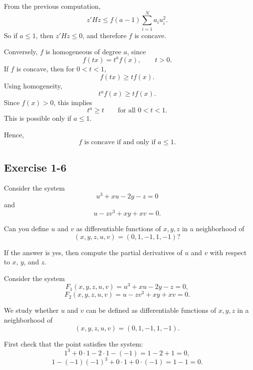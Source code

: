 From the previous computation,
\[
z'H z
\le
f(a-1)\sum_{i=1}^N a_i u_i^2.
\]
So if \(a\le 1\), then \(z'H z\le 0\), and therefore \(f\) is concave.

Conversely, \(f\) is homogeneous of degree \(a\), since
\[
f(tx)=t^a f(x), \qquad t>0.
\]
If \(f\) is concave, then for \(0<t<1\),
\[
f(tx)\ge t f(x).
\]
Using homogeneity,
\[
t^a f(x)\ge t f(x).
\]
Since \(f(x)>0\), this implies
\[
t^a\ge t \qquad \text{for all } 0<t<1.
\]
This is possible only if \(a\le 1\).

Hence,
\[
\boxed{f \text{ is concave if and only if } a\le 1.}
\]



\vspace{30pt}
\begin{tcolorbox}[breakable]

\subsection*{Exercise 1-6}

Consider the system
\[
u^3 + xu - 2y - z = 0
\]
and
\[
u - zv^3 + xy + xv = 0.
\]

Can you define $u$ and $v$ as differentiable functions of $x,y,z$
in a neighborhood of
\[
(x,y,z,u,v)=(0,1,-1,1,-1)?
\]

If the answer is yes, then compute the partial derivatives of
$u$ and $v$ with respect to $x$, $y$, and $z$.

\end{tcolorbox}


Consider the system
\[
F_1(x,y,z,u,v)=u^3+xu-2y-z=0,
\]
\[
F_2(x,y,z,u,v)=u-zv^3+xy+xv=0.
\]

We study whether \(u\) and \(v\) can be defined as differentiable functions of \(x,y,z\) in a neighborhood of
\[
(x,y,z,u,v)=(0,1,-1,1,-1).
\]

First check that the point satisfies the system:
\[
1^3+0\cdot 1-2\cdot 1-(-1)=1-2+1=0,
\]
\[
1-(-1)(-1)^3+0\cdot 1+0\cdot (-1)=1-1=0.
\]

